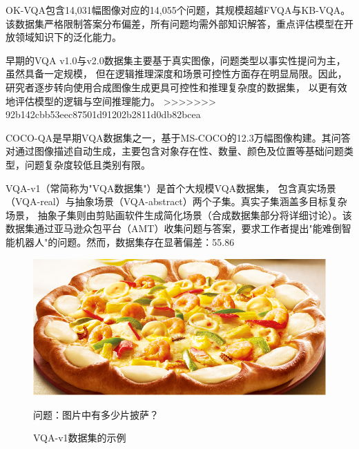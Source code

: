 OK-VQA\cite{marino2019ok}包含14,031幅图像对应的14,055个问题，其规模超越FVQA与KB-VQA。该数据集严格限制答案分布偏差，所有问题均需外部知识解答，重点评估模型在开放领域知识下的泛化能力。

早期的VQA v1.0与v2.0数据集主要基于真实图像，问题类型以事实性提问为主，虽然具备一定规模，
但在逻辑推理深度和场景可控性方面存在明显局限。因此，研究者逐步转向使用合成图像生成更具可控性和推理复杂度的数据集，
以更有效地评估模型的逻辑与空间推理能力。
>>>>>>> 92b142cbb53eec87501d91202b2811d0db82bcea

COCO-QA是早期VQA数据集之一，基于MS-COCO的12.3万幅图像构建。其问答对通过图像描述自动生成，主要包含对象存在性、数量、颜色及位置等基础问题类型，问题复杂度较低且类别有限。

VQA-v1\cite{Antol2015VQA}（常简称为"VQA数据集"）是首个大规模VQA数据集，
包含真实场景（VQA-real）与抽象场景（VQA-abstract）两个子集。真实子集涵盖多目标复杂场景，
抽象子集则由剪贴画软件生成简化场景（合成数据集部分将详细讨论）。该数据集通过亚马逊众包平台（AMT）收集问题与答案，要求工作者提出"能难倒智能机器人"的问题。然而，数据集存在显著偏差：55.86%
\begin{figure}[h]
    \centering
    \includegraphics[scale=0.4]{figures/example-from-vqa-v1.jpg}
    \begin{center}
        \footnotesize 问题：图片中有多少片披萨？
    \end{center}
    \caption{VQA-v1数据集的示例}
    \label{fig:example-from-vqa-v1}
\end{figure}

